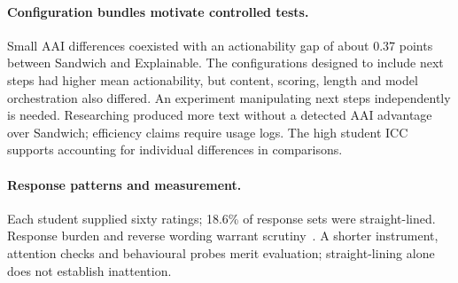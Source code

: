 \documentclass[runningheads]{llncs}
\begin{document}
\paragraph{Configuration bundles motivate controlled tests.}
Small AAI differences coexisted with an actionability gap of about 0.37 points between Sandwich and Explainable. The configurations designed to include next steps had higher mean actionability, but content, scoring, length and model orchestration also differed. An experiment manipulating next steps independently is needed. Researching produced more text without a detected AAI advantage over Sandwich; efficiency claims require usage logs. The high student ICC supports accounting for individual differences in comparisons.

\paragraph{Response patterns and measurement.}
Each student supplied sixty ratings; 18.6\% of response sets were straight-lined. Response burden and reverse wording warrant scrutiny~\cite{kim2019straightlining,vansonderen2013ineffectiveness}. A shorter instrument, attention checks and behavioural probes merit evaluation; straight-lining alone does not establish inattention.
\end{document}
